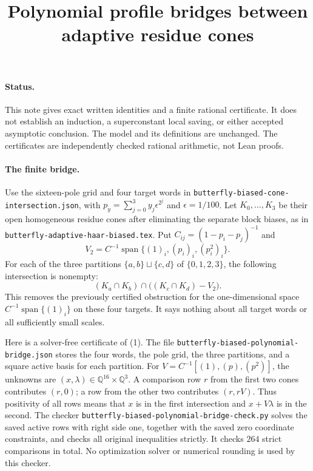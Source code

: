 \documentclass[11pt]{article}
\title{Polynomial profile bridges between adaptive residue cones}
\author{}\date{}
\begin{document}
\maketitle
\paragraph{Status.}
This note gives exact written identities and a finite rational certificate.
It does not establish an induction, a superconstant local saving, or either
accepted asymptotic conclusion. The model and its definitions are unchanged.
The certificates are independently checked rational arithmetic, not Lean proofs.

\paragraph{The finite bridge.}
Use the sixteen-pole grid and four target words in
\texttt{butterfly-biased-cone-intersection.json}, with
$p_y=\sum_{j=0}^3y_j\epsilon^{2^j}$ and $\epsilon=1/100$.
Let $K_0,\ldots,K_3$ be their open homogeneous residue cones after
eliminating the separate block biases, as in
\texttt{butterfly-adaptive-haar-biased.tex}.
Put $C_{ij}=(1-p_i-p_j)^{-1}$ and
\[
 V_2=C^{-1}\operatorname{span}\{(1)_i,(p_i)_i,(p_i^2)_i\}.
\]
For each of the three partitions $\{a,b\}\sqcup\{c,d\}$ of
$\{0,1,2,3\}$, the following intersection is nonempty:
\[
 (K_a\cap K_b)\cap\bigl((K_c\cap K_d)-V_2\bigr).             \tag{1}
\]
This removes the previously certified obstruction for the one-dimensional
space $C^{-1}\operatorname{span}\{(1)_i\}$ on these four targets.
It says nothing about all target words or all sufficiently small scales.

Here is a solver-free certificate of (1).
The file \texttt{butterfly-biased-polynomial-bridge.json} stores the four
words, the pole grid, the three partitions, and a square active basis
for each partition. For $V=C^{-1}[(1),(p),(p^2)]$, the unknowns are
$(x,\lambda)\in\mathbb Q^{16}\times\mathbb Q^3$.
A comparison row $r$ from the first two cones contributes $(r,0)$;
a row from the other two contributes $(r,rV)$.
Thus positivity of all rows means that $x$ is in the first intersection
and $x+V\lambda$ is in the second. The checker
\texttt{butterfly-biased-polynomial-bridge-check.py} solves the saved
active rows with right side one, together with the saved zero coordinate
constraints, and checks all original inequalities strictly. It checks
$264$ strict comparisons in total. No optimization solver or numerical
rounding is used by this checker.
\end{document}
